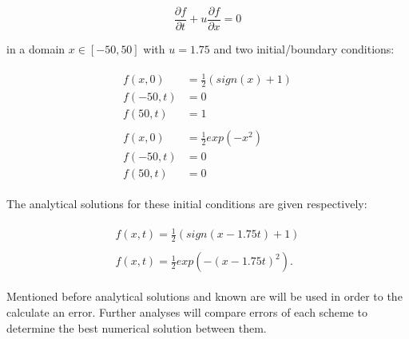		\begin{equation}
			\label{for:advection}
			\frac{\partial f}{\partial t} +  u\frac{\partial f}{\partial x} = 0
		\end{equation}
		
		in a domain $x \in [-50,50]$ with $u = 1.75$ and two initial/boundary conditions:
		
		\begin{subequations}
			\begin{align}
				\begin{split}
					\label{for:firstSet}
					f(x, 0) &= \frac{1}{2} (sign(x) + 1) \\
					f(-50, t) &= 0 \\
					f(50, t) &= 1
				\end{split} \\
				\begin{split}
					\label{for:secondSet}
					f(x, 0) &= \frac{1}{2} exp(-x^2) \\
					f(-50, t) &= 0 \\
					f(50, t) &= 0
				\end{split}
			\end{align}
		\end{subequations}
	
		The analytical solutions for these initial conditions are given respectively:
		
		\begin{subequations}
			\begin{align}
			\begin{split}
				f(x, t) = \frac{1}{2} (sign(x - 1.75t) + 1)
			\end{split} \\
			\begin{split}
				f(x, t) = \frac{1}{2} exp(-(x - 1.75t)^2).
			\end{split}
			\end{align}
		\end{subequations}
	
		Mentioned before analytical solutions and known are will be used in order to the calculate an error. Further analyses will compare errors of each scheme to determine the best numerical solution between them.